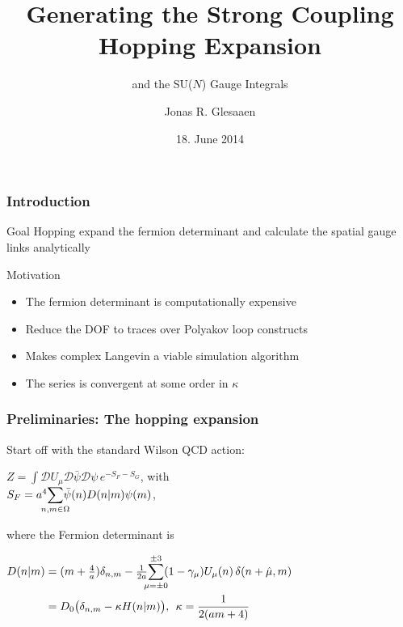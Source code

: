 \documentclass[10pt,a4paper,usenames,dvipsnames]{beamer}
\title[Hopping Expansion]{Generating the Strong Coupling Hopping Expansion}
\subtitle{and the SU($N$) Gauge Integrals}
\author[Glesaaen]{Jonas R. Glesaaen}
\institute[Goethe-Uni]{Goethe-Universit\"{a}t Frankfurt am Main}
\date{18. June 2014}
\begin{document}
{
  \begin{frame}
    \titlepage
  \end{frame}
}

\begin{frame}
  \frametitle{Introduction}

  \begin{alertblock}{Goal}
    Hopping expand the fermion determinant and calculate the spatial gauge links analytically
  \end{alertblock}

  \vfill

  \begin{block}{Motivation}
    \begin{itemize} \color{black} 
      \item The fermion determinant is computationally expensive
      \item Reduce the DOF to traces over Polyakov loop constructs
      \item Makes complex Langevin a viable simulation algorithm
      \item The series is convergent at some order in $\kappa$
    \end{itemize}
  \end{block}

\end{frame}

\begin{frame}
  \frametitle{Preliminaries: The hopping expansion}

  Start off with the standard Wilson QCD action:
  \begin{block}{}
    \centering
    $Z = {\displaystyle\int} \mathcal{D} U_{\mu} \mathcal{D} \bar{\psi} \mathcal{D} \psi \, e^{-S_F -S_G}$, with \\
    $S_F = a^4 {\displaystyle\sum_{\mathclap{n,m \in \Omega}}} \bar{\psi}(n) D(n|m) \psi(m)$,
  \end{block}
  where the Fermion determinant is
  \begin{block}{}
    \centering
    $\begin{aligned}
      D(n|m) &= (m + {\textstyle\frac{4}{a}}) \delta_{n,m} - {\textstyle\frac{1}{2a}} {\displaystyle\sum_{\mathclap{\mu = \pm 0}}^{\pm 3}} (1 - \gamma_{\mu})
      U_{\mu}(n) \, \delta(n + \hat{\mu}, m) \\
      &= D_0 \big( \delta_{n,m} - \kappa H(n|m) \big), \:\: \kappa = \frac{1}{2(am + 4)}
    \end{aligned}$
  \end{block}
\end{frame}
\end{document}
